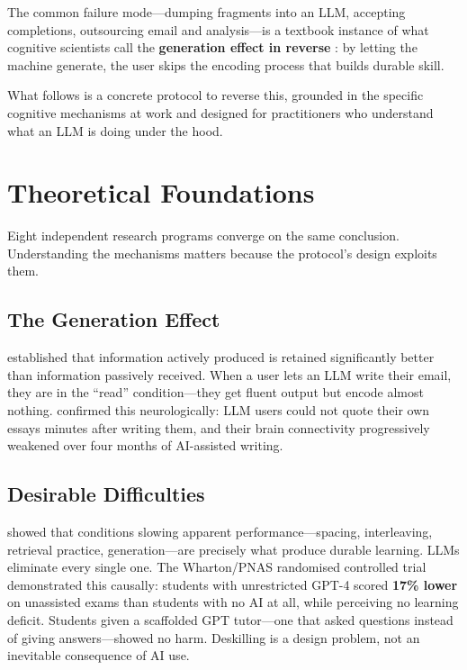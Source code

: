 \documentclass[11pt,a4paper]{article}
\begin{document}
The common failure mode---dumping fragments into an LLM, accepting completions,
outsourcing email and analysis---is a textbook instance of what cognitive
scientists call the \textbf{generation effect in reverse}
\citep{slamecka1978generation}: by letting the machine generate, the user skips
the encoding process that builds durable skill.

What follows is a concrete protocol to reverse this, grounded in the specific
cognitive mechanisms at work and designed for practitioners who understand what an
LLM is doing under the hood.

\section{Theoretical Foundations}
\label{sec:foundations}

Eight independent research programs converge on the same conclusion. Understanding
the mechanisms matters because the protocol's design exploits them.

\subsection{The Generation Effect}

\citet{slamecka1978generation} established that information actively produced is
retained significantly better than information passively received. When a user
lets an LLM write their email, they are in the ``read'' condition---they get
fluent output but encode almost nothing. \citet{kosmyna2025brain} confirmed this
neurologically: LLM users could not quote their own essays minutes after writing
them, and their brain connectivity progressively weakened over four months of
AI-assisted writing.

\subsection{Desirable Difficulties}

\citet{bjork1994desirable} showed that conditions slowing apparent
performance---spacing, interleaving, retrieval practice, generation---are
precisely what produce durable learning. LLMs eliminate every single one. The
Wharton/PNAS randomised controlled trial \citep{bastani2025learning}
demonstrated this causally: students with unrestricted GPT-4 scored \textbf{17\%
lower} on unassisted exams than students with no AI at all, while perceiving no
learning deficit. Students given a scaffolded GPT tutor---one that asked
questions instead of giving answers---showed no harm. Deskilling is a design
problem, not an inevitable consequence of AI use.
\end{document}
